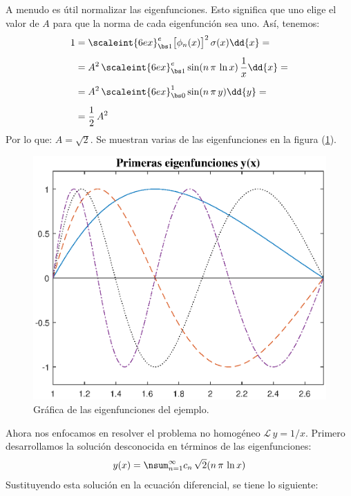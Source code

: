 \begin{ejemplo}
A menudo es útil normalizar las eigenfunciones. Esto significa que uno elige el valor de $A$ para que la norma de cada eigenfunción sea uno. Así, tenemos:
\begin{align}
\begin{aligned}[b]
1 &= \scaleint{6ex}_{\bs 1}^{e} \big[ \phi_{n} (x) \big]^{2} \, \sigma (x) \dd{x} = \\[0.5em]
&= A^{2} \, \scaleint{6ex}_{\bs 1}^{e} \sin (n \, \pi \, \ln x) \, \dfrac{1}{x} \dd{x} = \\[0.5em]
&= A^{2} \, \scaleint{6ex}_{\bs 0}^{1} \sin (n \, \pi \, y) \dd{y} = \\[0.5em]
&= \dfrac{1}{2} \, A^{2}
\end{aligned}
\label{eq:ecuacion_04_27}
\end{align}
Por lo que: $A = \sqrt{2}$. Se muestran varias de las eigenfunciones en la figura (\ref{fig:figura_04_02}).
\begin{figure}[H]
    \centering
    \includegraphics[scale=1]{Imagenes/Expansion_Eigenfunciones_01.eps}
    \caption{Gráfica de las eigenfunciones del ejemplo.}
    \label{fig:figura_04_02}
\end{figure}
Ahora nos enfocamos en resolver el problema no homogéneo $\mathcal{L} \, y = 1 / x$. Primero desarrollamos la solución desconocida en términos de las eigenfunciones:
\begin{align*}
y (x) = \nsum_{n=1}^{\infty} c_{n} \, \sqrt{2} (n \, \pi \, \ln x)
\end{align*}
Sustituyendo esta solución en la ecuación diferencial, se tiene lo siguiente:

\end{ejemplo}
